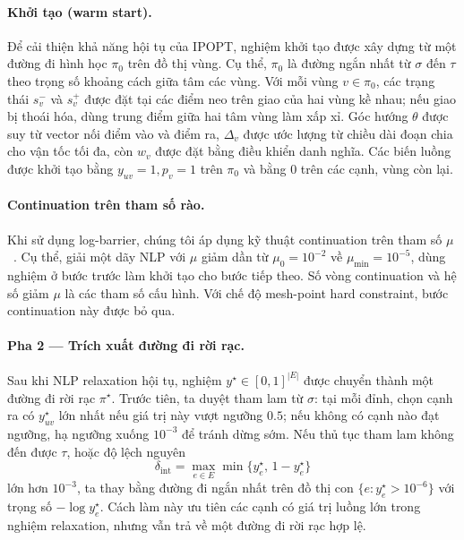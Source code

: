 \begin{appendices}
    \paragraph*{Khởi tạo (warm start).}
    Để cải thiện khả năng hội tụ của IPOPT, nghiệm khởi tạo được xây dựng từ một
    đường đi hình học $\pi_0$ trên đồ thị vùng. Cụ thể, $\pi_0$ là đường ngắn nhất
    từ $\sigma$ đến $\tau$ theo trọng số khoảng cách giữa tâm các vùng. Với mỗi vùng
    $v\in\pi_0$, các trạng thái $s_v^-$ và $s_v^+$ được đặt tại các điểm neo trên
    giao của hai vùng kề nhau; nếu giao bị thoái hóa, dùng trung điểm giữa hai tâm
    vùng làm xấp xỉ. Góc hướng $\theta$ được suy từ vector nối điểm vào và điểm ra,
    $\Delta_v$ được ước lượng từ chiều dài đoạn chia cho vận tốc tối đa, còn $w_v$
    được đặt bằng điều khiển danh nghĩa. Các biến luồng được khởi tạo bằng
    $y_{uv}=1,p_v=1$ trên $\pi_0$ và bằng $0$ trên các cạnh, vùng còn lại.

    \paragraph*{Continuation trên tham số rào.}
    Khi sử dụng log-barrier, chúng tôi áp dụng kỹ thuật continuation trên tham số
    $\mu$~\cite{BoydVandenberghe2004}. Cụ thể, giải một dãy NLP với $\mu$ giảm dần
    từ $\mu_0=10^{-2}$ về $\mu_{\min}=10^{-5}$, dùng nghiệm ở bước trước làm khởi
    tạo cho bước tiếp theo. Số vòng continuation và hệ số giảm $\mu$ là các tham số
    cấu hình. Với chế độ mesh-point hard constraint, bước continuation này được bỏ
    qua.

    \paragraph*{Pha 2 — Trích xuất đường đi rời rạc.}
    Sau khi NLP relaxation hội tụ, nghiệm $y^\star\in[0,1]^{|E|}$ được chuyển thành
    một đường đi rời rạc $\pi^\star$. Trước tiên, ta duyệt tham lam từ $\sigma$:
    tại mỗi đỉnh, chọn cạnh ra có $y_{uv}^\star$ lớn nhất nếu giá trị này vượt
    ngưỡng $0.5$; nếu không có cạnh nào đạt ngưỡng, hạ ngưỡng xuống $10^{-3}$ để
    tránh dừng sớm. Nếu thủ tục tham lam không đến được $\tau$, hoặc độ lệch nguyên
    \[
        \delta_{\mathrm{int}}
        =\max_{e\in E}\min\{y_e^\star,\,1-y_e^\star\}
    \]
    lớn hơn $10^{-3}$, ta thay bằng đường đi ngắn nhất trên đồ thị con
    $\{e:y_e^\star>10^{-6}\}$ với trọng số $-\log y_e^\star$. Cách làm này ưu tiên
    các cạnh có giá trị luồng lớn trong nghiệm relaxation, nhưng vẫn trả về một
    đường đi rời rạc hợp lệ.


\end{appendices}
